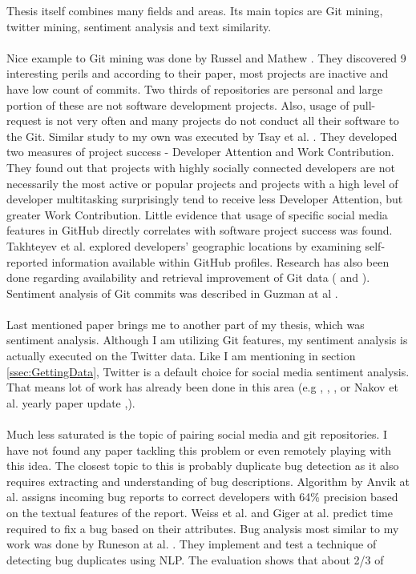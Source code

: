 Thesis itself combines many fields and areas. Its main topics are Git mining, twitter mining, sentiment analysis and text similarity.\\
\\
Nice example to Git mining was done by Russel and Mathew \cite{russell2013mining}. They discovered 9 interesting perils and according to their paper, most projects are inactive and have low count of commits. Two thirds of repositories are personal and large portion of these are not software development projects. Also, usage of pull-request is not very often and many projects do not conduct all their software to the Git. Similar study to my own was executed by Tsay et al. \cite{tsay2012social}. They developed two measures of project success - Developer Attention and Work
Contribution. They found out that projects with highly socially connected developers are not necessarily the most
active or popular projects and projects with a high level of developer multitasking surprisingly tend to receive less
Developer Attention, but greater Work Contribution. Little evidence that usage of specific social media features in GitHub directly correlates with software project success was found.  Takhteyev et al. \cite{takhteyev2010investigating} explored developers' geographic locations by examining self-reported information available within GitHub profiles. Research has also been done regarding availability and retrieval improvement of Git data (\cite{wagstrom2013network} and \cite{gousios2012ghtorrent}). Sentiment analysis of Git commits was described in Guzman at al \cite{guzman2014sentiment}.\\
\\
Last mentioned paper brings me to another part of my thesis, which was sentiment analysis. Although I am utilizing Git features, my sentiment analysis is actually executed on the Twitter data. Like I am mentioning in section \ref{ssec:GettingData}, Twitter is a default choice for social media sentiment analysis. That means lot of work has already been done in this area (e.g \cite{agarwal2011sentiment}, \cite{kouloumpis2011twitter}, \cite{pak2010twitter}, \cite{saif2012semantic} or Nakov et al. yearly paper update \cite{nakov2016semeval},\cite{rosenthal2017semeval}).\\
\\
Much less saturated is the topic of pairing social media and  git repositories. I have not found any paper tackling this problem or even remotely playing with this idea. The closest topic to this is probably duplicate bug detection as it also requires extracting and understanding of bug descriptions. Algorithm by Anvik at al. \cite{anvik2005coping} assigns incoming bug reports to correct developers with 64\% precision based on the textual features of the report. Weiss et al. \cite{weiss2007long} and Giger at al. \cite{giger2010predicting} predict time required to fix a bug based on their attributes. Bug analysis most similar to my work was done by Runeson at al. \cite{runeson2007detection}. They implement and test a technique of detecting bug duplicates using NLP. The evaluation shows that about 2/3 of
